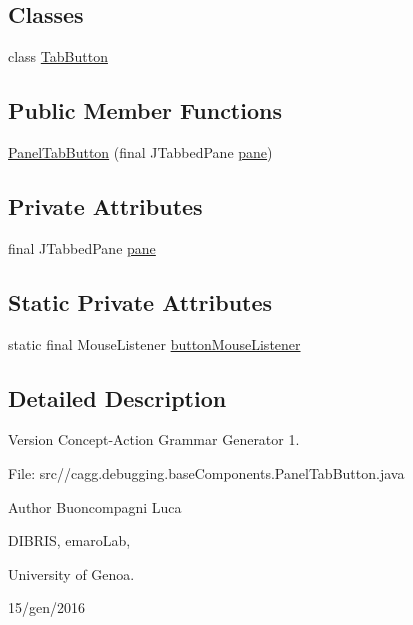 \subsection*{Classes}
\begin{DoxyCompactItemize}
\item 
class \hyperlink{classit_1_1emarolab_1_1cagg_1_1debugging_1_1baseComponents_1_1PanelTabButton_1_1TabButton}{Tab\-Button}
\end{DoxyCompactItemize}
\subsection*{Public Member Functions}
\begin{DoxyCompactItemize}
\item 
\hyperlink{classit_1_1emarolab_1_1cagg_1_1debugging_1_1baseComponents_1_1PanelTabButton_a27193303a5e0dc7c127f9749f251154a}{Panel\-Tab\-Button} (final J\-Tabbed\-Pane \hyperlink{classit_1_1emarolab_1_1cagg_1_1debugging_1_1baseComponents_1_1PanelTabButton_a101965a46434888ec10c4dabba55faa1}{pane})
\end{DoxyCompactItemize}
\subsection*{Private Attributes}
\begin{DoxyCompactItemize}
\item 
final J\-Tabbed\-Pane \hyperlink{classit_1_1emarolab_1_1cagg_1_1debugging_1_1baseComponents_1_1PanelTabButton_a101965a46434888ec10c4dabba55faa1}{pane}
\end{DoxyCompactItemize}
\subsection*{Static Private Attributes}
\begin{DoxyCompactItemize}
\item 
static final Mouse\-Listener \hyperlink{classit_1_1emarolab_1_1cagg_1_1debugging_1_1baseComponents_1_1PanelTabButton_ada571f68c939c2796ecfc6baff50a001}{button\-Mouse\-Listener}
\end{DoxyCompactItemize}


\subsection{Detailed Description}
\begin{DoxyVersion}{Version}
Concept-\/\-Action Grammar Generator 1. \par
 File\-: src//cagg.debugging.\-base\-Components.\-Panel\-Tab\-Button.\-java \par

\end{DoxyVersion}
\begin{DoxyAuthor}{Author}
Buoncompagni Luca \par
 D\-I\-B\-R\-I\-S, emaro\-Lab,\par
 University of Genoa. \par
 15/gen/2016 \par

\end{DoxyAuthor}


